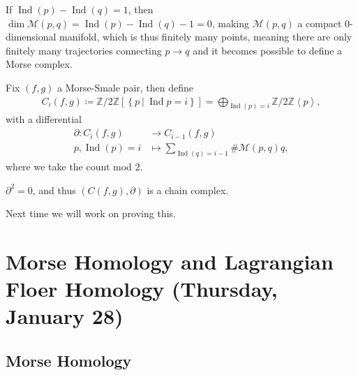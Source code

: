 \begin{remark}

If \(\mathop{\mathrm{Ind}}(p) - \mathop{\mathrm{Ind}}(q) = 1\), then
\(\dim \mathcal{M}(p, q) = \mathop{\mathrm{Ind}}(p) - \mathop{\mathrm{Ind}}(q) - 1 = 0\),
making \(\mathcal{M}(p, q)\) a compact 0-dimensional manifold, which is
thus finitely many points, meaning there are only finitely many
trajectories connecting \(p\to q\) and it becomes possible to define a
Morse complex.

\end{remark}

\begin{definition}

Fix \((f, g)\) a Morse-Smale pair, then define
\begin{align*}
C_i(f, g) \coloneqq{\mathbb{Z}}/2{\mathbb{Z}}\left[\left\{{p {~\mathrel{\Big|}~}\mathop{\mathrm{Ind}}p = i}\right\}\right] = \bigoplus_{\mathop{\mathrm{Ind}}(p) = i} {\mathbb{Z}}/2{\mathbb{Z}}\left\langle{p}\right\rangle
,\end{align*}
with a differential
\begin{align*}
{{\partial}}: C_i(f, g) &\to C_{i-1}(f, g) \\
p, \mathop{\mathrm{Ind}}(p) = i & \mapsto \sum_{\mathop{\mathrm{Ind}}(q) = i-1} \# \mathcal{M}(p, q) q 
,\end{align*}
where we take the count mod 2.

\end{definition}

\begin{theorem}[?]

\({{\partial}}^2 = 0\), and thus \(( C(f, g), {{\partial}})\) is a chain
complex.

\end{theorem}

Next time we will work on proving this.

\hypertarget{morse-homology-and-lagrangian-floer-homology-thursday-january-28}{%
\section{Morse Homology and Lagrangian Floer Homology (Thursday, January
28)}\label{morse-homology-and-lagrangian-floer-homology-thursday-january-28}}

\hypertarget{morse-homology}{%
\subsection{Morse Homology}\label{morse-homology}}

